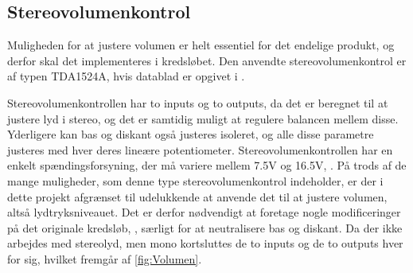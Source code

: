 \subsection{Stereovolumenkontrol}
\label{Volumenkontrol}
%
Muligheden for at justere volumen er helt essentiel for det endelige produkt, og derfor skal det implementeres i kredsløbet. Den anvendte stereovolumenkontrol er af typen TDA1524A, hvis datablad er opgivet i \textcite{PDF:VolumeControl}. 

Stereovolumenkontrollen har to inputs og to outputs, da det er beregnet til at justere lyd i stereo, og det er samtidig muligt at regulere balancen mellem disse. Yderligere kan bas og diskant også justeres isoleret, og alle disse parametre justeres med hver deres lineære potentiometer. Stereovolumenkontrollen har en enkelt spændingsforsyning, der må variere mellem 7.5V og 16.5V, \parencite[5]{PDF:VolumeControl}. 
\blankline
På trods af de mange muligheder, som denne type stereovolumenkontrol indeholder, er der i dette projekt afgrænset til udelukkende at anvende det til at justere volumen, altså lydtryksniveauet. Det er derfor nødvendigt at foretage nogle modificeringer på det originale kredsløb, \parencite[3]{PDF:VolumeControl}, særligt for at neutralisere bas og diskant. Da der ikke arbejdes med stereolyd, men mono kortsluttes de to inputs og de to outputs hver for sig, hvilket fremgår af \autoref{fig:Volumen}.


